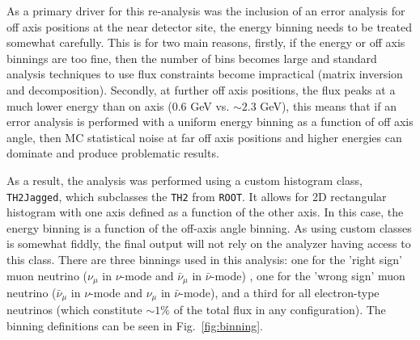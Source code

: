 \documentclass{article}
\begin{document}
As a primary driver for this re-analysis was the inclusion of an error analysis for off axis positions at the near detector site, the energy binning needs to be treated somewhat carefully. This is for two main reasons, firstly, if the energy or off axis binnings are too fine, then the number of bins becomes large and standard analysis techniques to use flux constraints become impractical (matrix inversion and decomposition). Secondly, at further off axis positions, the flux peaks at a much lower energy than on axis ($0.6$ GeV vs. $\sim 2.3$ GeV), this means that if an error analysis is performed with a uniform energy binning as a function of off axis angle, then MC statistical noise at far off axis positions and higher energies can dominate and produce problematic results.

As a result, the analysis was performed using a custom histogram class, \texttt{TH2Jagged}, which subclasses the \texttt{TH2} from \texttt{ROOT}. It allows for 2D rectangular histogram with one axis defined as a function of the other axis. In this case, the energy binning is a function of the off-axis angle binning. As using custom classes is somewhat fiddly, the final output will not rely on the analyzer having access to this class. There are three binnings used in this analysis: one for the 'right sign' muon neutrino ($\nu_{\mu}$ in $\nu$-mode and $\bar{\nu}_{\mu}$ in $\bar{\nu}$-mode) , one for the 'wrong sign' muon neutrino ($\bar{\nu}_{\mu}$ in $\nu$-mode and $\nu_{\mu}$ in $\bar{\nu}$-mode), and a third for all electron-type neutrinos (which constitute $\sim 1\% $ of the total flux in any configuration). The binning definitions can be seen in Fig.~\ref{fig:binning}.
\end{document}

